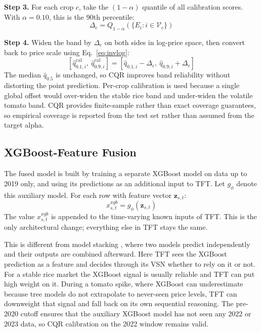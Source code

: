 \documentclass[conference,twoside]{IEEEtran}
\begin{document}
\textbf{Step 3.} For each crop $c$, take the $(1-\alpha)$ quantile of all calibration scores. With $\alpha = 0.10$, this is the 90th percentile:
\begin{equation}
\Delta_c = Q_{1-\alpha}\!\left( \{E_i : i \in \mathcal{V}_c\} \right)
\label{eq:cqr_offset}
\end{equation}

\textbf{Step 4.} Widen the band by $\Delta_c$ on both sides in log-price space, then convert back to price scale using Eq.~\ref{eq:invlog}:
\begin{equation}
\left[ \hat{q}_{0.1,i}^{\text{cal}},\ \hat{q}_{0.9,i}^{\text{cal}} \right] =
\left[ \hat{q}_{0.1,i} - \Delta_c,\ \hat{q}_{0.9,i} + \Delta_c \right]
\label{eq:cqr_apply}
\end{equation}
The median $\hat{q}_{0.5}$ is unchanged, so CQR improves band reliability without distorting the point prediction. Per-crop calibration is used because a single global offset would over-widen the stable rice band and under-widen the volatile tomato band. CQR provides finite-sample rather than exact coverage guarantees, so empirical coverage is reported from the test set rather than assumed from the target alpha.

\subsection{XGBoost-Feature Fusion}
\label{sec:fusion}
The fused model is built by training a separate XGBoost model on data up to 2019 only, and using its predictions as an additional input to TFT. Let $g_\phi$ denote this auxiliary model. For each row with feature vector $\mathbf{z}_{s,t}$:
\begin{equation}
x^{xgb}_{s,t} = g_\phi(\mathbf{z}_{s,t})
\label{eq:xgb_feature}
\end{equation}
The value $x^{xgb}_{s,t}$ is appended to the time-varying known inputs of TFT. This is the only architectural change; everything else in TFT stays the same.

This is different from model stacking \cite{wolpert1992stacking}, where two models predict independently and their outputs are combined afterward. Here TFT sees the XGBoost prediction as a feature and decides through its VSN whether to rely on it or not. For a stable rice market the XGBoost signal is usually reliable and TFT can put high weight on it. During a tomato spike, where XGBoost can underestimate because tree models do not extrapolate to never-seen price levels, TFT can downweight that signal and fall back on its own sequential reasoning. The pre-2020 cutoff ensures that the auxiliary XGBoost model has not seen any 2022 or 2023 data, so CQR calibration on the 2022 window remains valid.
\end{document}
